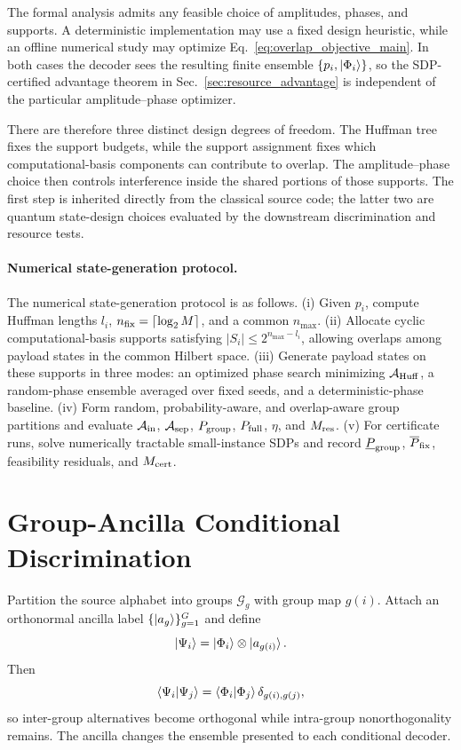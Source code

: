 \documentclass[
 reprint,
 amsmath,amssymb,
 aps,
 pra,
 floatfix,
]{revtex4-2}
\begin{document}
The formal analysis admits any feasible choice of amplitudes, phases, and supports. A deterministic implementation may use a fixed design heuristic, while an offline numerical study may optimize Eq.~\eqref{eq:overlap_objective_main}. In both cases the decoder sees the resulting finite ensemble \(\{p_i,\ket{\Phi_i}\}\), so the SDP-certified advantage theorem in Sec.~\ref{sec:resource_advantage} is independent of the particular amplitude--phase optimizer.

There are therefore three distinct design degrees of freedom. The Huffman tree fixes the support budgets, while the support assignment fixes which computational-basis components can contribute to overlap. The amplitude--phase choice then controls interference inside the shared portions of those supports. The first step is inherited directly from the classical source code; the latter two are quantum state-design choices evaluated by the downstream discrimination and resource tests.

\paragraph*{Numerical state-generation protocol.}
The numerical state-generation protocol is as follows. (i) Given \(p_i\), compute Huffman lengths \(l_i\), \(n_{\rm fix}=\lceil\log_2M\rceil\), and a common \(n_{\max}\). (ii) Allocate cyclic computational-basis supports satisfying \(|S_i|\le 2^{n_{\max}-l_i}\), allowing overlaps among payload states in the common Hilbert space. (iii) Generate payload states on these supports in three modes: an optimized phase search minimizing \(\mathcal A_{\rm Huff}\), a random-phase ensemble averaged over fixed seeds, and a deterministic-phase baseline. (iv) Form random, probability-aware, and overlap-aware group partitions and evaluate \(\mathcal A_{\rm in}\), \(\mathcal A_{\rm sep}\), \(P_{\rm group}\), \(P_{\rm full}\), \(\eta\), and \(M_{\rm res}\). (v) For certificate runs, solve numerically tractable small-instance SDPs and record \(\underline P_{\rm group}\), \(\overline P_{\rm fix}\), feasibility residuals, and \(M_{\rm cert}\).

\section{Group-Ancilla Conditional Discrimination}
\label{sec:group_discrimination}

Partition the source alphabet into groups $\mathcal G_g$ with group map $g(i)$. Attach an orthonormal ancilla label $\{\ket{a_g}\}_{g=1}^G$ and define
\begin{equation}
    \ket{\Psi_i}=\ket{\Phi_i}\otimes\ket{a_{g(i)}}.
    \label{eq:psi_group_state_main}
\end{equation}
Then
\begin{equation}
    \braket{\Psi_i|\Psi_j}=\braket{\Phi_i|\Phi_j}\delta_{g(i),g(j)},
    \label{eq:group_orthogonality_main}
\end{equation}
so inter-group alternatives become orthogonal while intra-group nonorthogonality remains. The ancilla changes the ensemble presented to each conditional decoder.
\end{document}
